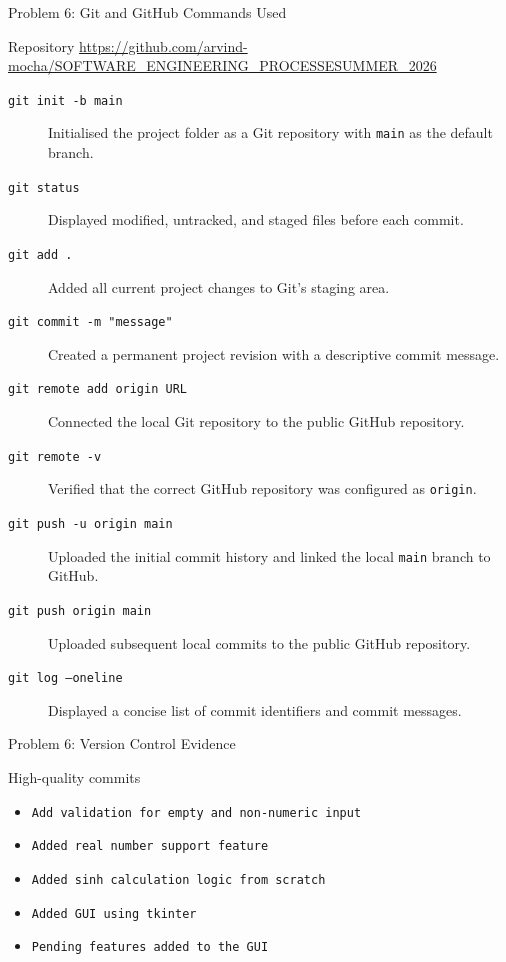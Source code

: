 \documentclass[aspectratio=169,11pt]{beamer}
\begin{document}
\begin{frame}[t]{Problem 6: Git and GitHub Commands Used}
\scriptsize

\begin{block}{Repository}
\centering
\url{https://github.com/arvind-mocha/SOFTWARE_ENGINEERING_PROCESSESUMMER_2026}
\end{block}

\begin{description}

\item[\texttt{git init -b main}]
Initialised the project folder as a Git repository with
\texttt{main} as the default branch.

\item[\texttt{git status}]
Displayed modified, untracked, and staged files before each commit.

\item[\texttt{git add .}]
Added all current project changes to Git's staging area.

\item[\texttt{git commit -m "message"}]
Created a permanent project revision with a descriptive commit message.

\item[\texttt{git remote add origin URL}]
Connected the local Git repository to the public GitHub repository.

\item[\texttt{git remote -v}]
Verified that the correct GitHub repository was configured as
\texttt{origin}.

\item[\texttt{git push -u origin main}]
Uploaded the initial commit history and linked the local
\texttt{main} branch to GitHub.

\item[\texttt{git push origin main}]
Uploaded subsequent local commits to the public GitHub repository.

\item[\texttt{git log --oneline}]
Displayed a concise list of commit identifiers and commit messages.

\end{description}

\end{frame}


\begin{frame}{Problem 6: Version Control Evidence}
\begin{block}{High-quality commits}
\begin{itemize}
    \item \texttt{Add validation for empty and non-numeric input}
    \item \texttt{Added real number support feature}
    \item \texttt{Added sinh calculation logic from scratch}
    \item \texttt{Added GUI using tkinter}
    \item \texttt{Pending features added to the GUI}
\end{itemize}
\end{block}
\end{frame}
\end{document}
